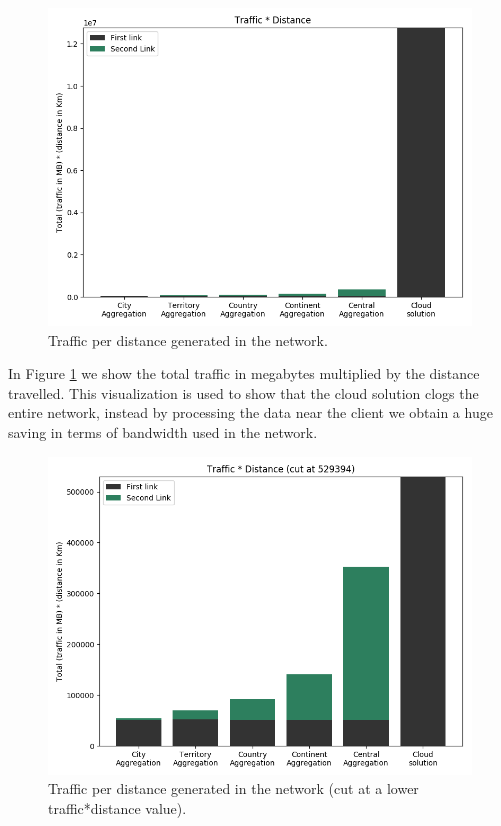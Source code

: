 \begin{figure}[H]
    \centering
    \includegraphics[width=0.95\linewidth]{Figures/Evaluation/write-by-traffic1.png}
    \caption{Traffic per distance generated in the network.}
    \label{fig:write-by-traffic1}
\end{figure}

In Figure \ref{fig:write-by-traffic1} we show the total traffic in megabytes multiplied by the distance travelled. This visualization is used to show that the cloud solution clogs the entire network, instead by processing the data near the client we obtain a huge saving in terms of bandwidth used in the network.

\begin{figure}[H]
    \centering
    \includegraphics[width=0.95\linewidth]{Figures/Evaluation/write-by-traffic2.png}
    \caption{Traffic per distance generated in the network (cut at a lower traffic*distance value).}
    \label{fig:write-by-traffic2}
\end{figure}

